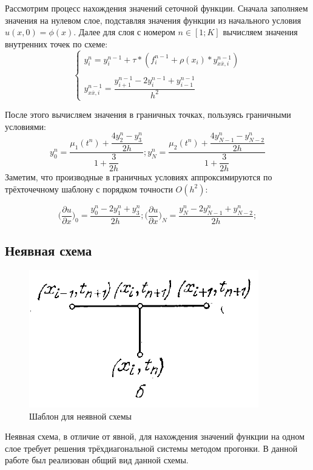 \documentclass[12pt]{article}
\begin{document}
Рассмотрим процесс нахождения значений сеточной функции. Сначала заполняем значения на нулевом слое, подставляя значения функции из начального условия $u(x, 0) = \phi(x)$. Далее для слоя с номером $n \in [1; K]$ вычисляем значения внутренних точек по схеме:
$$
\begin{cases}
y_i^n = y_i^{n-1} + \tau*(f_i^{n-1} + \rho(x_i)*y_{x\overline{x}, i}^{n-1}) \\ \\ 
y_{x\overline{x}, i}^{n-1} = \dfrac{y_{i+1}^{n-1} - 2y_i^{n-1} + y_{i-1}^{n-1}}{h^2}
\end{cases}
$$

После этого вычисляем значения в граничных точках, пользуясь граничными условиями:
$$
y_0^n = \dfrac{\mu_1(t^n) + \dfrac{4y_2^n - y_3^n}{2h}}{1 + \dfrac{3}{2h}} ; y_N^n = \dfrac{\mu_2(t^n) + \dfrac{4y_{N-1}^n - y_{N-2}^n}{2h}}{1 + \dfrac{3}{2h}} 
$$
Заметим, что производные в граничных условиях аппроксимируются по трёхточечному шаблону с порядком точности $O(h^2)$:

$$
\bigg( \dfrac{\partial u}{\partial x} \bigg)_0 = \dfrac{y_0^n - 2y_1^n + y_3^n}{2h}; 
\bigg( \dfrac{\partial u}{\partial x} \bigg)_N = \dfrac{y_N^n - 2y_{N-1}^n + y_{N-2}^n}{2h}; 
$$

\newpage

\subsection{Неявная схема}

\begin{figure}[h]
\begin{center}
\includegraphics[scale = 0.8]{imp.png} 
\end{center}
\caption{Шаблон для неявной схемы}
\end{figure}

Неявная схема, в отличие от явной, для нахождения значений функции на одном слое требует решения трёхдиагональной системы методом прогонки.
В данной работе был реализован общий вид данной схемы.
\end{document}
